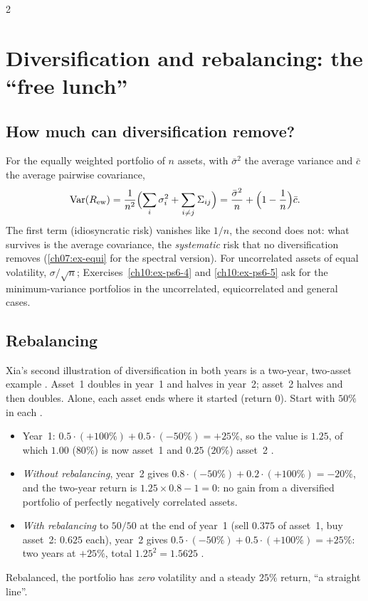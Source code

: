 \begin{paracol}{2}
\section{Diversification and rebalancing: the ``free lunch''}\label{ch10:sec-rebal}

\subsection{How much can diversification remove?}
For the equally weighted portfolio of $n$ assets, with $\bar\sigma^2$ the average variance and $\bar c$ the average
pairwise covariance,
\begin{equation}\label{ch10:eq-ew}
  \operatorname{Var}(R_{\rm ew})=\frac1{n^2}\Bigl(\sum_i\sigma_i^2+\sum_{i\ne j}\Sigma_{ij}\Bigr)=\frac{\bar\sigma^2}n+\Bigl(1-\frac1n\Bigr)\bar c .
\end{equation}
The first term (idiosyncratic risk) vanishes like $1/n$, the second does not: what survives is the average
covariance, the \emph{systematic} risk that no diversification removes (\cref{ch07:ex-equi} for the spectral
version). For uncorrelated assets of equal volatility, $\sigma/\sqrt n$; Exercises~\ref{ch10:ex-ps6-4} and
\ref{ch10:ex-ps6-5} ask for the minimum-variance portfolios in the uncorrelated, equicorrelated and general cases.

\subsection{Rebalancing}
Xia's second illustration of diversification in both years is a two-year, two-asset example
. Asset~1 doubles in year~1 and halves in year~2; asset~2 halves and then doubles.
Alone, each asset ends where it started (return $0$). Start with $50\%$ in each .
\begin{itemize}
  \item Year~1: $0.5\cdot(+100\%)+0.5\cdot(-50\%)=+25\%$, so the value is $1.25$, of which
        $1.00$ ($80\%$) is now asset~1 and $0.25$ ($20\%$) asset~2 .
  \item \emph{Without rebalancing}, year~2 gives $0.8\cdot(-50\%)+0.2\cdot(+100\%)=-20\%$, and the two-year return is
        $1.25\times0.8-1=0$: no gain from a diversified portfolio of perfectly negatively correlated assets.
  \item \emph{With rebalancing} to $50/50$ at the end of year~1 (sell $0.375$ of asset~1, buy asset~2: $0.625$ each),
        year~2 gives $0.5\cdot(-50\%)+0.5\cdot(+100\%)=+25\%$: two years at $+25\%$, total $1.25^2=1.5625$
        .
\end{itemize}
Rebalanced, the portfolio has \emph{zero} volatility and a steady $25\%$ return, ``a straight line''.


\end{paracol}
